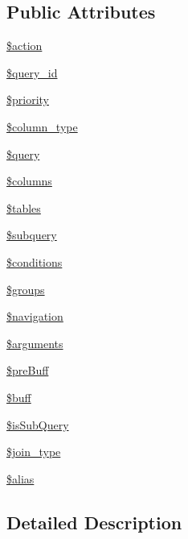 \subsection*{Public Attributes}
\begin{DoxyCompactItemize}
\item 
\hyperlink{classQueryTag_a5e2e78261306a4a4db69c643e9524e60}{\$action}
\item 
\hyperlink{classQueryTag_ac9ddaab237f51a26128e5f4d2869a430}{\$query\+\_\+id}
\item 
\hyperlink{classQueryTag_ac09e6c0124ba1d5945c7f93232e13827}{\$priority}
\item 
\hyperlink{classQueryTag_a617db2d7a2db9fddba0959b43cc40458}{\$column\+\_\+type}
\item 
\hyperlink{classQueryTag_a40fbf27ebaa31f5430080152164c3bae}{\$query}
\item 
\hyperlink{classQueryTag_a375d57839b60d616ed27af9f42acd3a1}{\$columns}
\item 
\hyperlink{classQueryTag_aed79c0c40d39fe9042ade3b23b6e172e}{\$tables}
\item 
\hyperlink{classQueryTag_a1fb40050f2484c2daa9e77cf53d11c15}{\$subquery}
\item 
\hyperlink{classQueryTag_a7cf9adc98dec4da0e67c1dcd25b7e5b5}{\$conditions}
\item 
\hyperlink{classQueryTag_aa456465c5358ae400751727cd943683e}{\$groups}
\item 
\hyperlink{classQueryTag_a60f53db40ea035c8e9c88ab2681e3792}{\$navigation}
\item 
\hyperlink{classQueryTag_a236e4bf42871aeac6c84f4dbbd1e6cb2}{\$arguments}
\item 
\hyperlink{classQueryTag_ac51df39445e0b132d1fa388c01ebf56d}{\$pre\+Buff}
\item 
\hyperlink{classQueryTag_abe10d8fd334fac380dd5540b2c0bdcc8}{\$buff}
\item 
\hyperlink{classQueryTag_ac657cdbbef0ca8f1907197cbf91f1040}{\$is\+Sub\+Query}
\item 
\hyperlink{classQueryTag_a8ab11b51470b725b766e2d53bb947ba4}{\$join\+\_\+type}
\item 
\hyperlink{classQueryTag_a86de241a75c3037c30272c7eb4a2cfbc}{\$alias}
\end{DoxyCompactItemize}


\subsection{Detailed Description}


